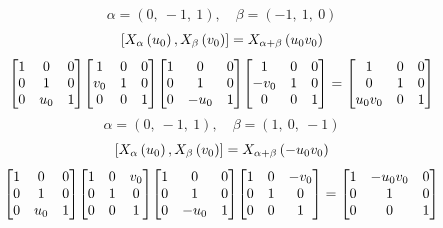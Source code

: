 \documentclass[11pt]{article}
\theoremstyle{definition}
\begin{document}
\[
\alpha = \left( 0, \  -1, \  1\right), \quad \beta = \left( -1, \  1, \  0\right)
\]
\[
\scaletoalign{\textwidth}{\left[ X_{\alpha}\left(u_{0}\right), X_{\beta}\left(v_{0}\right) \right] = X_{\alpha + \beta}\left(u_{0} v_{0}\right)}
\]
\[
\scaletoalign{\textwidth}{{\left[\begin{matrix}1 & 0 & 0\\0 & 1 & 0\\0 & u_{0} & 1\end{matrix}\right]} {\left[\begin{matrix}1 & 0 & 0\\v_{0} & 1 & 0\\0 & 0 & 1\end{matrix}\right]} {\left[\begin{matrix}1 & 0 & 0\\0 & 1 & 0\\0 & - u_{0} & 1\end{matrix}\right]} {\left[\begin{matrix}1 & 0 & 0\\- v_{0} & 1 & 0\\0 & 0 & 1\end{matrix}\right]} = {\left[\begin{matrix}1 & 0 & 0\\0 & 1 & 0\\u_{0} v_{0} & 0 & 1\end{matrix}\right]}}
\]
\[
\alpha = \left( 0, \  -1, \  1\right), \quad \beta = \left( 1, \  0, \  -1\right)
\]
\[
\scaletoalign{\textwidth}{\left[ X_{\alpha}\left(u_{0}\right), X_{\beta}\left(v_{0}\right) \right] = X_{\alpha + \beta}\left(- u_{0} v_{0}\right)}
\]
\[
\scaletoalign{\textwidth}{{\left[\begin{matrix}1 & 0 & 0\\0 & 1 & 0\\0 & u_{0} & 1\end{matrix}\right]} {\left[\begin{matrix}1 & 0 & v_{0}\\0 & 1 & 0\\0 & 0 & 1\end{matrix}\right]} {\left[\begin{matrix}1 & 0 & 0\\0 & 1 & 0\\0 & - u_{0} & 1\end{matrix}\right]} {\left[\begin{matrix}1 & 0 & - v_{0}\\0 & 1 & 0\\0 & 0 & 1\end{matrix}\right]} = {\left[\begin{matrix}1 & - u_{0} v_{0} & 0\\0 & 1 & 0\\0 & 0 & 1\end{matrix}\right]}}
\]
\end{document}
